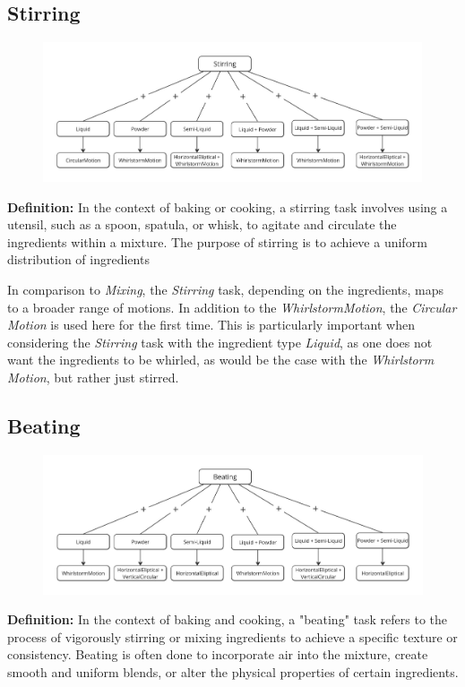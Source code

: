 \subsection{Stirring}
\begin{figure}[H]
    \includegraphics[scale=0.25]{Graphics/StirringDecisionTree.jpg}
    \end{figure}
\textbf{Definition:}
In the context of baking or cooking, a stirring task involves using a utensil, such as a spoon, spatula, or whisk, to agitate and circulate the ingredients within a mixture. The purpose of stirring is to achieve a uniform distribution of ingredients

In comparison to \textit{Mixing}, the \textit{Stirring} task, depending on the ingredients, maps to a broader range of motions. In addition to the \textit{WhirlstormMotion}, the \textit{Circular Motion} is used here for the first time. This is particularly important when considering the \textit{Stirring} task with the ingredient type \textit{Liquid}, as one does not want the ingredients to be whirled, as would be the case with the \textit{Whirlstorm Motion}, but rather just stirred.
\subsection{Beating}
\begin{figure}[H]
    \includegraphics[scale=0.25]{Graphics/BeatingDecisionTree.jpg}
    \end{figure}
\textbf{Definition:}
In the context of baking and cooking, a "beating" task refers to the process of vigorously stirring or mixing ingredients to achieve a specific texture or consistency. Beating is often done to incorporate air into the mixture, create smooth and uniform blends, or alter the physical properties of certain ingredients.

